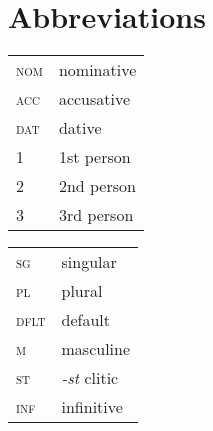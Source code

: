 \documentclass[output=paper,colorlinks,citecolor=brown,
]{langscibook}
\begin{document}





\section*{Abbreviations}
\begin{tabularx}{.5\textwidth}{lQ}
\textsc{nom} & nominative   \\
\textsc{acc} & accusative    \\
\textsc{dat} & dative     \\
\textsc{1}   & 1st person  \\
\textsc{2}   & 2nd person \\
\textsc{3}   & 3rd person \\    
\end{tabularx}
\begin{tabularx}{.5\textwidth}{lQ}
\textsc{sg}   & singular   \\
\textsc{pl}   & plural     \\
\textsc{dflt} & default    \\
\textsc{m}    & masculine  \\
\textsc{st}   & \textit{-st} clitic \\
\textsc{inf}  & infinitive\\
\end{tabularx}

\printbibliography[heading=subbibliography,notkeyword=this]
\end{document}
